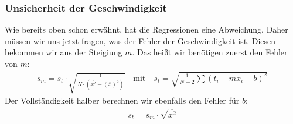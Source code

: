 \documentclass[letterpaper,10pt,english]{jupyterBook}
\begin{document}
\subsubsection{Unsicherheit der Geschwindigkeit }
\label{\detokenize{content/1_Kurvenanpassung:unsicherheit-der-geschwindigkeit-a-id-subsec-u-geschwindigkeit-a}}
\sphinxAtStartPar
Wie bereits oben schon erwähnt, hat die Regressionen eine Abweichung. Daher müssen wir uns jetzt fragen, was der Fehler der Geschwindigkeit ist. Diesen bekommen wir aus der Steigiung \(m\). Das heißt wir benötigen zuerst den Fehler von \(m\):
\begin{equation*}
\begin{split}s_m = s_t \cdot \sqrt{\frac{1}{N\cdot (\overline{x^2} - (\overline x)^2)}} \quad \textrm{mit} \quad s_t = \sqrt{\frac{1}{N-2}\sum(t_i - mx_i - b)^2 }\end{split}
\end{equation*}
\sphinxAtStartPar
Der Vollständigkeit halber berechnen wir ebenfalls den Fehler für \(b\):
\begin{equation*}
\begin{split}s_b  = s_m \cdot \sqrt{\overline{x^2}}\end{split}
\end{equation*}
\end{document}
